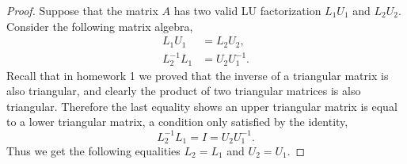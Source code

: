 \documentclass[12pt]{article}
\makeatletter
\theoremstyle{homework}
\newenvironment{exercise}[1]
{\def\@currentlabel{#1}\exercisecore}
{\endexercisecore}
\makeatother
\begin{document}
\begin{exercise}{20.1}
\begin{proof}
    
    \vspace{1in}
    Suppose that the matrix $A$ has two valid LU factorization $L_1U_1$ and $L_2U_2$. Consider the following matrix algebra, 
    \begin{align*}
      L_1U_1 &= L_2U_2,\\
      L^{-1}_2L_1 &= U_2U^{-1}_1.
    \end{align*}
    Recall that in homework 1 we proved that the inverse of a triangular matrix is also triangular, and clearly the product of two triangular matrices is also triangular. Therefore the last equality shows an 
    upper triangular matrix is equal to a lower triangular matrix, a condition only satisfied by the identity, 
    \begin{equation*}
      L^{-1}_2L_1 = I = U_2U^{-1}_1.
    \end{equation*}
    Thus we get the following equalities  $L_2 = L_1 $ and $U_2 = U_1 $.
  \end{proof}
\end{exercise}


\vspace{1in}
\end{document}
